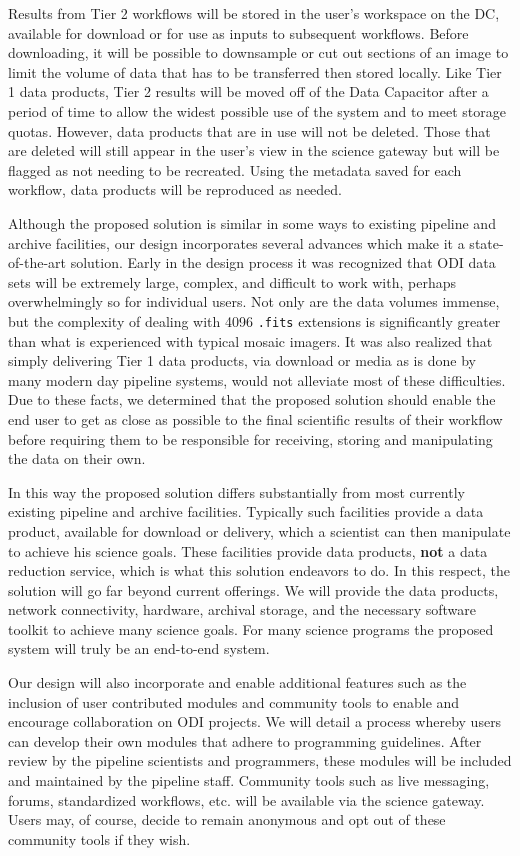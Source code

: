 \documentclass[10pt,conference]{IEEEtran}
\begin{document}
Results from Tier 2 workflows will be stored in the user's workspace on the DC, available for download or for use as inputs to subsequent workflows. Before downloading, it will be possible to downsample or cut out sections of an image to limit the volume of data that has to be transferred then stored locally. Like Tier 1 data products, Tier 2 results will be moved off of the Data Capacitor after a period of time to allow the widest possible use of the system and to meet storage quotas. However, data products that are in use will not be deleted. Those that are deleted will still appear in the user's view in the science gateway but will be flagged as not needing to be recreated. Using the metadata saved for each workflow, data products will be reproduced as needed.

Although the proposed solution is similar in some ways to existing pipeline and archive facilities, our design incorporates several advances which make it a state-of-the-art solution. Early in the design process it was recognized that ODI data sets will be extremely large, complex, and difficult to work with, perhaps overwhelmingly so for individual users. Not only are the data volumes immense, but the complexity of dealing with 4096 {\tt .fits} extensions is significantly greater than what is experienced with typical mosaic imagers. It was also realized that simply delivering Tier 1 data products, via download or media as is done by many modern day pipeline systems, would not alleviate most of these difficulties. Due to these facts, we determined that the proposed solution should enable the end user to get as close as possible to the final scientific results of their workflow before requiring them to be responsible for receiving, storing and manipulating the data on their own. 

In this way the proposed solution differs substantially from most currently existing pipeline and archive facilities. Typically such facilities provide a data product, available for download or delivery, which a scientist can then manipulate to achieve his science goals. These facilities provide data products, {\bf not} a data reduction service, which is what this solution endeavors to do. In this respect, the solution will go far beyond current offerings. We will provide the data products, network connectivity, hardware, archival storage, and the necessary software toolkit to achieve many science goals. For many science programs the proposed system will truly be an end-to-end system.

Our design will also incorporate and enable additional features such as the inclusion of user contributed modules and community tools to enable and encourage collaboration on ODI projects. We will detail a process whereby users can develop their own modules that adhere to programming guidelines. After review by the pipeline scientists and programmers, these modules will be included and maintained by the pipeline staff. Community tools such as live messaging, forums, standardized workflows, etc. will be available via the science gateway. Users may, of course, decide to remain anonymous and opt out of these community tools if they wish. 
\end{document}
